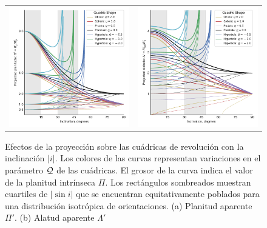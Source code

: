\begin{figure}
  \centering
  \begin{tabular}{lr}
    \includegraphics[width=0.5\linewidth]{./Figures/projected-Rc-vs-i} &
    \includegraphics[width=0.5\linewidth]{./Figures/projected-R90-vs-i}
  \end{tabular}
  \caption[Efectos de la proyección sobre las cuádricas de revolución con la inclinación $|i|$]{Efectos de la proyección sobre las cuádricas de revolución con la inclinación $|i|$. Los colores de las curvas representan variaciones en el parámetro $\mathcal{Q}$ de las cuádricas. El grosor de la curva indica el valor de la planitud intrínseca $\Pi$. Los rectángulos sombreados muestran cuartiles de $|\sin i|$ que se encuentran equitativamente poblados para una distribución isotrópica de orientaciones. (a) Planitud aparente $\Pi'$. (b) Alatud aparente $\Lambda'$}
  \label{fig:proj-L-P-vs-i}
\end{figure}

